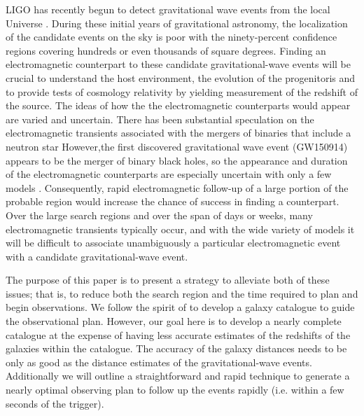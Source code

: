 \documentclass[useAMS,usenatbib]{mn2e}
\begin{document}
LIGO has recently begun to detect gravitational wave events from the
local Universe \citep{PhysRevLett.116.061102}.  During these initial
years of gravitational astronomy, the localization of the candidate
events on the sky is poor with the ninety-percent confidence regions
covering hundreds or even thousands of square degrees.  Finding an
electromagnetic counterpart to these candidate gravitational-wave
events will be crucial to understand the host environment, the
evolution of the progenitoris and to provide tests of cosmology
relativity by yielding measurement of the redshift of the source.  The
ideas of how the the electromagnetic counterparts would appear are
varied and uncertain. There has been substantial speculation on the
electromagnetic transients associated with the mergers of binaries
that include a neutron star
\citep[e.g.][]{2016PhRvD..93b4011E,2016arXiv160107711K,2016arXiv160100017D,2015arXiv151205435F,2015ApJ...814L..20M,2015PhRvD..92d4028K,2015arXiv150807939S,2015arXiv150807911S}
However,the first discovered gravitational wave event (GW150914)
appears to be the merger of binary black holes, so the appearance and
duration of the electromagnetic counterparts are especially uncertain
with only a few models
\citep[e.g.][]{2015PhRvL.115n1102G,2015MNRAS.452.3419M,2016MNRAS.457..939C,2016ApJ...817..183Y}.
Consequently, rapid electromagnetic follow-up of a large portion of
the probable region would increase the chance of success in finding a
counterpart.  Over the large search regions and over the span of days
or weeks, many electromagnetic transients typically occur, and with
the wide variety of models it will be difficult to associate
unambiguously a particular electromagnetic event with a candidate
gravitational-wave event.

The purpose of this paper is to present a strategy to alleviate both
of these issues; that is, to reduce both the search region and the
time required to plan and begin observations.  We follow the spirit of
\citet{2015arXiv150803608G} to develop a galaxy catalogue to guide the
observational plan.  However, our goal here is to develop a nearly
complete catalogue at the expense of having less accurate estimates of
the redshifts of the galaxies within the catalogue.  The accuracy of
the galaxy distances needs to be only as good as the distance estimates
of the gravitational-wave events.  Additionally we will outline a
straightforward and rapid technique to generate a nearly optimal
observing plan to follow up the events rapidly (i.e. within a few
seconds of the trigger). 
\end{document}
